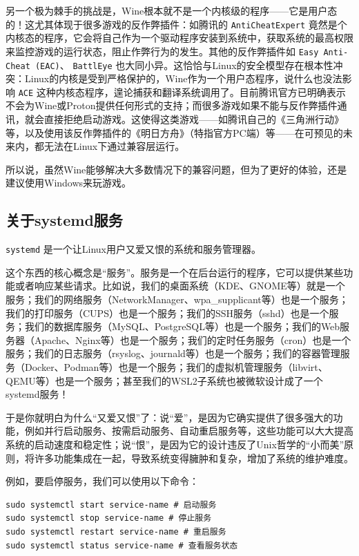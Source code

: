 另一个极为棘手的挑战是，Wine根本就不是一个内核级的程序——它是用户态的！这尤其体现于很多游戏的反作弊插件：如腾讯的 \verb|AntiCheatExpert| 竟然是个内核态的程序，它会将自己作为一个驱动程序安装到系统中，获取系统的最高权限来监控游戏的运行状态，阻止作弊行为的发生。其他的反作弊插件如 \verb|Easy Anti-Cheat (EAC)|、 \verb|BattlEye| 也大同小异。这恰恰与Linux的安全模型存在根本性冲突：Linux的内核是受到严格保护的，Wine作为一个用户态程序，说什么也没法影响 \verb|ACE| 这种内核态程序，遑论捕获和翻译系统调用了。目前腾讯官方已明确表示不会为Wine或Proton提供任何形式的支持；而很多游戏如果不能与反作弊插件通讯，就会直接拒绝启动游戏。这使得这类游戏——如腾讯自己的《三角洲行动》等，以及使用该反作弊插件的《明日方舟》（特指官方PC端）等——在可预见的未来内，都无法在Linux下通过兼容层运行。

所以说，虽然Wine能够解决大多数情况下的兼容问题，但为了更好的体验，还是建议使用Windows来玩游戏。

\subsection{关于systemd服务}

\verb|systemd| 是一个让Linux用户又爱又恨的系统和服务管理器。

这个东西的核心概念是“服务”。服务是一个在后台运行的程序，它可以提供某些功能或者响应某些请求。比如说，我们的桌面系统（KDE、GNOME等）就是一个服务；我们的网络服务（NetworkManager、wpa\_supplicant等）也是一个服务；我们的打印服务（CUPS）也是一个服务；我们的SSH服务（sshd）也是一个服务；我们的数据库服务（MySQL、PostgreSQL等）也是一个服务；我们的Web服务器（Apache、Nginx等）也是一个服务；我们的定时任务服务（cron）也是一个服务；我们的日志服务（rsyslog、journald等）也是一个服务；我们的容器管理服务（Docker、Podman等）也是一个服务；我们的虚拟机管理服务（libvirt、QEMU等）也是一个服务；甚至我们的WSL2子系统也被微软设计成了一个systemd服务！

于是你就明白为什么“又爱又恨”了：说“爱”，是因为它确实提供了很多强大的功能，例如并行启动服务、按需启动服务、自动重启服务等，这些功能可以大大提高系统的启动速度和稳定性；说“恨”，是因为它的设计违反了Unix哲学的“小而美”原则，将许多功能集成在一起，导致系统变得臃肿和复杂，增加了系统的维护难度。

例如，要启停服务，我们可以使用以下命令：
\begin{verbatim}
sudo systemctl start service-name # 启动服务
sudo systemctl stop service-name # 停止服务
sudo systemctl restart service-name # 重启服务
sudo systemctl status service-name # 查看服务状态
\end{verbatim}

